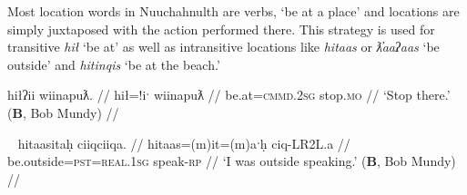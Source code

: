 \vspace{10pt}

Most location words in Nuuchahnulth are verbs, `be at a place' and locations are simply juxtaposed with the action performed there. This strategy is used for transitive \textit{hił} `be at' as well as intransitive locations like \textit{hitaas} or \textit{ƛ̓aaʔaas} `be outside' and \textit{hitinqis} `be at the beach.'

\ex \label{ex:stopthere}
\begingl
\glpreamble hiłʔii wiinapuƛ. //
\gla hił=!iˑ wiinapuƛ //
\glb be.at=\textsc{cmmd.2sg} stop.\textsc{mo} //
\glft `Stop there.' (\textbf{B}, Bob Mundy) //
\endgl
\xe

\begin{comment}
\ex \label{ex:workathome}
\begingl
\glpreamble hiłitin maḥt̓iiʔakqas mamuuk. //
\gla hił=(m)it=(m)in maḥt̓ii=ʔak=qaˑs mamuuk //
\glb be.at=\textsc{pst}=\textsc{strg.1pl} house=\textsc{poss}=\textsc{defn.1sg} work.\textsc{dr} //
\glft `We worked at my house.' (\textbf{N}, Fidelia Haiyupis) //
\endgl
\xe

\ex \label{ex:screamatbeach}
\begingl
\glpreamble n̓aʔiičiʔeƛ naʔuu łuucma ʕiikʕiika hitinqis. //
\gla n̓a-iˑčiƛ=!aƛ naʔuu łuucma ʕik-LR2L.a hitinqis //
\glb see-\textsc{in}=\textsc{now} be.with woman=\textsc{poss} scream-\textsc{rp} be.at.beach //
\glft `He heard a woman screaming on the beach.' (\textbf{C}, \textit{tupaat} Julia Lucas) //
\endgl
\xe
\end{comment}


\ex~ \label{ex:speakoutside}
\begingl
\glpreamble hitaasitaḥ ciiqciiqa. //
\gla hitaas=(m)it=(m)aˑḥ ciq-LR2L.a //
\glb be.outside=\textsc{pst}=\textsc{real.1sg} speak-\textsc{rp} //
\glft `I was outside speaking.' (\textbf{B}, Bob Mundy) //
\endgl
\xe

\begin{comment}
\ex~ \label{ex:speakoutside}
\begingl
\glpreamble qiiʔaƛintiis mamuuk ƛ̓aaʔaas. //
\gla qii=!aƛ=int=iis mamuuk ƛ̓aaʔaas //
\glb long.time=\textsc{now}=\textsc{pst}=\textsc{weak.1sg} work.\textsc{dr} be.outside //
\glft `I was working outside for a long time.' (\textbf{Q}, Sophie Billy) //
\endgl
\xe

\ex~ \label{ex:hideonroof}
\begingl
\glpreamble haptsaapaqƛiis suutił hiłaayiłkʷ. //
\gla hapt-saˑp=ʔaqƛ=iis sut-L.(č)ił hił-aˑyił=uk. //
\glb hide-\textsc{mo.caus}=\textsc{fut}=\textsc{weak.1sg} \textsc{2sg}-do.to be.at-on.a.roof=\textsc{poss} //
\glft `I will hide you on the roof.' (\textbf{Q}, Sophie Billy) //
\endgl
\xe
\end{comment}

